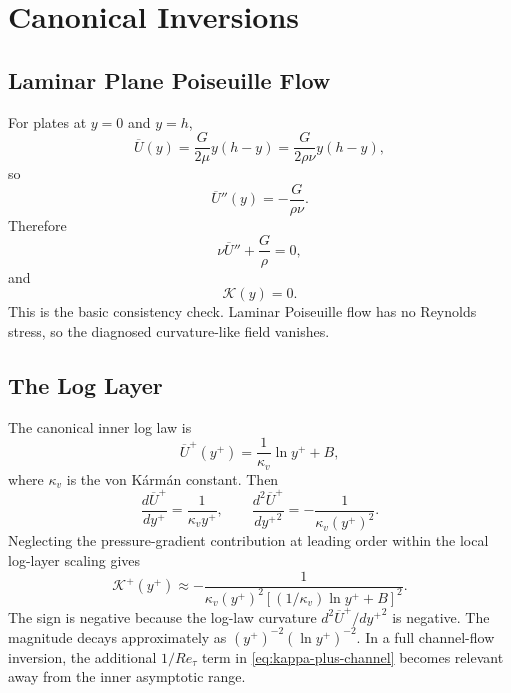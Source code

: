 \documentclass[11pt]{article}
\newcommand{\Ut}{\overline{U}}
\newcommand{\Ret}{Re_\tau}
\newcommand{\kapg}{\mathcal{K}}
\newcommand{\kapv}{\kappa_v}
\begin{document}
\section{Canonical Inversions}
\label{sec:inversion}

\subsection{Laminar Plane Poiseuille Flow}

For plates at $y=0$ and $y=h$,
\begin{equation}
\Ut(y)=\frac{G}{2\mu}y(h-y)=\frac{G}{2\rho\nu}y(h-y),
\end{equation}
so
\begin{equation}
\Ut''(y)=-\frac{G}{\rho\nu}.
\end{equation}
Therefore
\begin{equation}
\nu\Ut''+\frac{G}{\rho}=0,
\end{equation}
and
\begin{equation}
\boxed{\kapg(y)=0.}
\end{equation}
This is the basic consistency check. Laminar Poiseuille flow has no Reynolds stress, so the diagnosed curvature-like field vanishes.

\subsection{The Log Layer}

The canonical inner log law is
\begin{equation}
\Ut^+(y^+)=\frac{1}{\kapv}\ln y^+ + B,
\end{equation}
where $\kapv$ is the von K\'arm\'an constant. Then
\begin{equation}
\frac{d\Ut^+}{dy^+}=\frac{1}{\kapv y^+},\qquad
\frac{d^2\Ut^+}{d{y^+}^2}=-\frac{1}{\kapv (y^+)^2}.
\end{equation}
Neglecting the pressure-gradient contribution at leading order within the local log-layer scaling gives
\begin{equation}
\boxed{\;\kapg^+(y^+)\approx
-\frac{1}{\kapv (y^+)^2\left[(1/\kapv)\ln y^+ + B\right]^2}.\;}
\label{eq:log-kappa}
\end{equation}
The sign is negative because the log-law curvature $d^2\Ut^+/d{y^+}^2$ is negative. The magnitude decays approximately as $(y^+)^{-2}(\ln y^+)^{-2}$. In a full channel-flow inversion, the additional $1/\Ret$ term in \eqref{eq:kappa-plus-channel} becomes relevant away from the inner asymptotic range.
\end{document}
